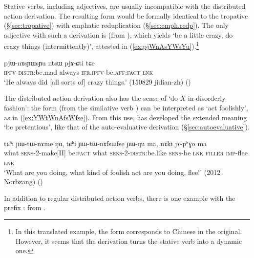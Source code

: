 
Stative verbs, including adjectives, are usually incompatible with the distributed action derivation. The resulting form would be formally identical to the tropative (§\ref{sec:tropative}) with emphatic reduplication (§\ref{sec:emph.redp}). The only adjective with such a derivation is  (from ), which yields  `be a little crazy, do crazy things (intermittently)', attested in (\ref{ex:pjWnAsYWsYu}).\footnote{
In this translated example, the form  corresponds to Chinese  in the original. However, it seems that the derivation turns the stative verb into a dynamic one. } 

\begin{exe}
\ex \label{ex:pjWnAsYWsYu}
\gll pjɯ-nɤsɲɯsɲu ntsɯ pjɤ-ɕti tɕe  \\
\textsc{ipfv}-\textsc{distr}:be.mad always \textsc{ifr}.\textsc{ipfv}-be.\textsc{aff}:\textsc{fact} \textsc{lnk} \\
\glt `He always did [all sorts of] crazy things.' (150829 jidian-zh) ()
\end{exe}

The distributed action derivation also has the sense of `do $X$ in disorderly fashion': the form  (from the similative verb ) can be interpreted as `act foolishly', as in (\ref{ex:YWtWnAfsWfse}). From this use,  has developed the extended meaning `be pretentious', like that of the auto-evaluative derivation (§\ref{sec:autoevaluative}).

\begin{exe}
\ex \label{ex:YWtWnAfsWfse}
\gll tɕʰi ɲɯ-tɯ-nɤme ŋu, tɕʰi ɲɯ-tɯ-nɤfsɯfse ɲɯ-ŋu ma, nɤki jɤ-pʰɣo ma \\
what \textsc{sens}-2-make[II] be:\textsc{fact} what \textsc{sens}-2-\textsc{distr}:be.like \textsc{sens}-be \textsc{lnk} \textsc{filler} \textsc{imp}-flee \textsc{lnk} \\
\glt `What are you doing, what kind of foolish act are you doing, flee!' (2012 Norbzang)
()
\end{exe}

In addition to regular distributed action verbs, there is one example with the prefix :  from .

